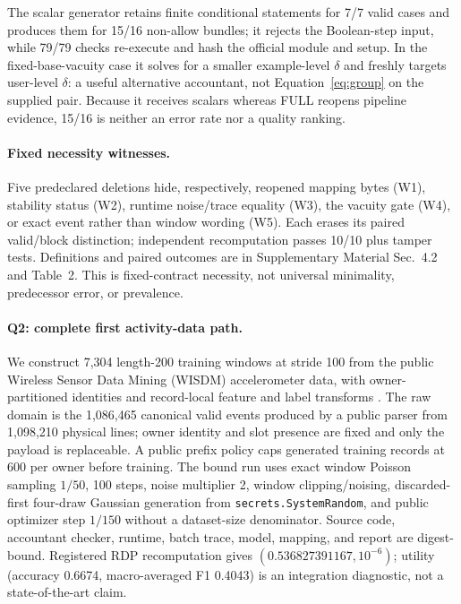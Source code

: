 \documentclass[letterpaper]{article} %
\begin{document}
The scalar generator retains finite conditional statements for 7/7 valid cases and produces them for 15/16 non-allow bundles; it rejects the Boolean-step input, while 79/79 checks re-execute and hash the official module and setup. In the fixed-base-vacuity case it solves for a smaller example-level $\delta$ and freshly targets user-level $\delta$: a useful alternative accountant, not Equation~\eqref{eq:group} on the supplied pair. Because it receives scalars whereas FULL reopens pipeline evidence, 15/16 is neither an error rate nor a quality ranking.

\paragraph{Fixed necessity witnesses.}
Five predeclared deletions hide, respectively, reopened mapping bytes (W1), stability status (W2), runtime noise/trace equality (W3), the vacuity gate (W4), or exact event rather than window wording (W5). Each erases its paired valid/block distinction; independent recomputation passes 10/10 plus tamper tests. Definitions and paired outcomes are in Supplementary Material Sec.~4.2 and Table~2. This is fixed-contract necessity, not universal minimality, predecessor error, or prevalence.

\paragraph{Q2: complete first activity-data path.}
We construct 7,304 length-200 training windows at stride 100 from the public Wireless Sensor Data Mining (WISDM) accelerometer data, with owner-partitioned identities and record-local feature and label transforms \citep{kwapisz2011activity}. The raw domain is the 1,086,465 canonical valid events produced by a public parser from 1,098,210 physical lines; owner identity and slot presence are fixed and only the payload is replaceable. A public prefix policy caps generated training records at 600 per owner before training. The bound run uses exact window Poisson sampling $1/50$, 100 steps, noise multiplier 2, window clipping/noising, discarded-first four-draw Gaussian generation from \texttt{secrets.SystemRandom}, and public optimizer step $1/150$ without a dataset-size denominator. Source code, accountant checker, runtime, batch trace, model, mapping, and report are digest-bound. Registered RDP recomputation gives $(0.536827391167,10^{-6})$; utility (accuracy 0.6674, macro-averaged F1 0.4043) is an integration diagnostic, not a state-of-the-art claim.
\end{document}
